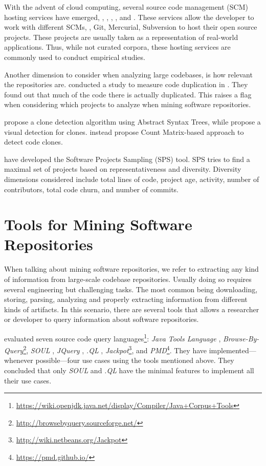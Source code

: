 With the advent of cloud computing,
several source code management (SCM) hosting services have emerged, \eg{},
\github{}, \gitlab{}, \bitbucket{}, and \sourceforge{}.
These services allow the developer to work with different SCMs, \eg,
Git, Mercurial, Subversion to host their open source projects.
These projects are usually taken as a representation of
real-world applications.
Thus, while not curated corpora, these hosting services are
commonly used to conduct empirical studies.

Another dimension to consider when analyzing large codebases, is how relevant the repositories are.
\cite{lopesDeJaVuMapCode2017} conducted a study to measure code duplication in \github{}.
They found out that much of the code there is actually duplicated.
This raises a flag when considering which projects to analyze when mining software repositories.

\cite{baxterCloneDetectionUsing1998} propose a clone detection algorithm using Abstract Syntax Trees,
while \cite{riegerVisualDetectionDuplicated} propose a visual detection for clones.
\cite{yuanCMCDCountMatrix2011,chenReplicationReproductionCode} instead propose Count Matrix-based approach to detect code clones.

\cite{nagappanDiversitySoftwareEngineering2013} have developed the Software Projects Sampling (SPS) tool.
SPS tries to find a maximal set of projects based on representativeness and diversity.
Diversity dimensions considered include total lines of code,
project age, activity, number of contributors, total code churn,
and number of commits.

\section{Tools for Mining Software Repositories}
\label{sec:literature-review:mining}

When talking about mining software repositories,
we refer to extracting any kind of information from large-scale codebase repositories. 
Usually doing so requires several engineering but challenging tasks.
The most common being downloading, storing, parsing, analyzing and
properly extracting information from different kinds of artifacts.
In this scenario, there are several tools that allows a researcher or developer to query information about software repositories.

\cite{urmaProgrammingLanguageEvolution2012} evaluated seven source code
query languages\footnote{\url{https://wiki.openjdk.java.net/display/Compiler/Java+Corpus+Tools}}:
\emph{Java Tools Language} \citep{cohenJTLJavaTools},
\emph{Browse-By-Query}\footnote{\url{http://browsebyquery.sourceforge.net/}},
\emph{SOUL} \citep{derooverSOULToolSuite2011},
\emph{JQuery} \citep{volderJqueryGenericCode2006},
\emph{.QL} \citep{moorKeynoteAddressQL2007},
\emph{Jackpot}\footnote{\url{http://wiki.netbeans.org/Jackpot}}, and
\emph{PMD}\footnote{\url{https://pmd.github.io/}}.
They have implemented---whenever possible---four use cases using the tools mentioned above.
They concluded that only \emph{SOUL} and \emph{.QL} have the minimal features to implement all their use cases.

